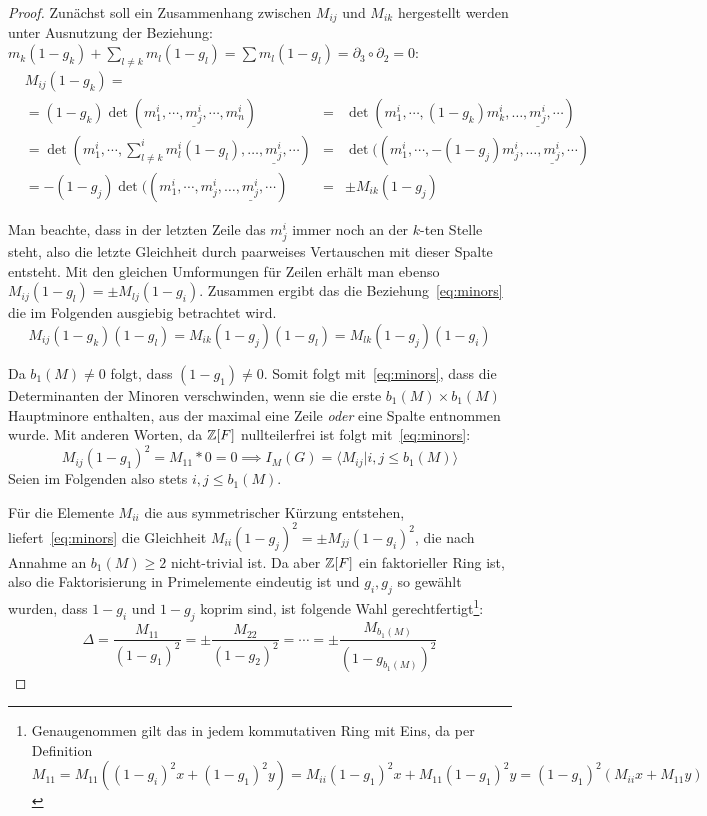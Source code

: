 \begin{proof}
	Zunächst soll ein Zusammenhang zwischen $M_{ij}$ und $M_{ik}$ hergestellt werden unter Ausnutzung der Beziehung: $m_k(1-g_k)+\sum_{l \neq k}m_l(1-g_l)= \sum m_l(1-g_l)=\partial_3 \circ \partial_2 =0$:
	\begin{align*}
	&M_{ij}(1-g_k)=\\
	&	=(1-g_k)\det(m^i_1,\cdots,\underline {m^i_j},\cdots,m^i_n)&=& \det(m^i_1,\cdots,(1-g_k)m^i_k,\dots,\underline {m^i_j},\cdots)\\
	&				 =\det(m^i_1,\cdots,\sum^i_{l \neq k}m^i_l(1-g_l),\dots,\underline {m^i_j},\cdots) &=&\det((m^i_1,\cdots,-(1-g_j)m^i_j,\dots,\underline {m^i_j},\cdots)\\
	&				 =-(1-g_j)\det((m^i_1,\cdots,m^i_j,\dots,\underline {m^i_j},\cdots) &=& \pm M_{ik}(1-g_j)
	\end{align*}

	Man beachte, dass in der letzten Zeile das $m_j^i$ immer noch an der $k$-ten Stelle steht, also die letzte Gleichheit durch paarweises Vertauschen mit dieser Spalte entsteht. Mit den gleichen Umformungen für Zeilen erhält man ebenso $M_{ij}(1-g_l)=\pm M_{lj}(1-g_i)$. Zusammen ergibt das die Beziehung~\eqref{eq:minors} die im Folgenden ausgiebig betrachtet wird.
	\begin{equation}
		M_{ij}(1-g_k)(1-g_l)=M_{ik}(1-g_j)(1-g_l)=M_{lk}(1-g_j)(1-g_i) \label{eq:minors}
	\end{equation}

	Da $b_1(M)\neq 0$ folgt, dass $(1-g_1)\neq 0$. Somit folgt mit~\eqref{eq:minors}, dass die Determinanten der Minoren verschwinden, wenn sie die erste $b_1(M)\times b_1(M)$ Hauptminore enthalten, aus der maximal eine Zeile \emph{oder} eine Spalte entnommen wurde. Mit anderen Worten, da $\mathbb{Z}[F]$ nullteilerfrei ist folgt mit~\eqref{eq:minors}:
	\[
		M_{ij}(1-g_1)^2 = M_{11}*0=0 \implies I_M(G)= \langle M_{ij}|i,j \leq b_1(M) \rangle
	\]
	Seien im Folgenden also stets $i,j\leq b_1(M)$.

	Für die Elemente $M_{ii}$ die aus symmetrischer Kürzung entstehen, liefert~\eqref{eq:minors} die Gleichheit $M_{ii}(1-g_j)^2=\pm M_{jj}(1-g_i)^2$, die nach Annahme an $b_1(M)\geq 2$ nicht-trivial ist. Da aber $\mathbb{Z}[F]$ ein faktorieller Ring ist, also die Faktorisierung in Primelemente eindeutig ist und $g_i,g_j$ so gewählt wurden, dass $1-g_i$ und $1-g_j$ koprim sind, ist folgende Wahl gerechtfertigt\footnote{Genaugenommen gilt das in jedem kommutativen Ring mit Eins, da per Definition $$M_{11}=M_{11}((1-g_i)^2x +(1-g_1)^2 y)= M_{ii}(1-g_1)^2x + M_{11}(1-g_1)^2y =(1-g_1)^2 (M_{ii}x+ M_{11} y)$$}:
	\[
		\Delta = \frac{M_{11}}{(1-g_1)^2} = \pm \frac{M_{22}}{(1-g_2)^2} = \cdots = \pm \frac{M_{b_1(M)}}{(1-g_{b_1(M)})^2}
	\]


\end{proof}
